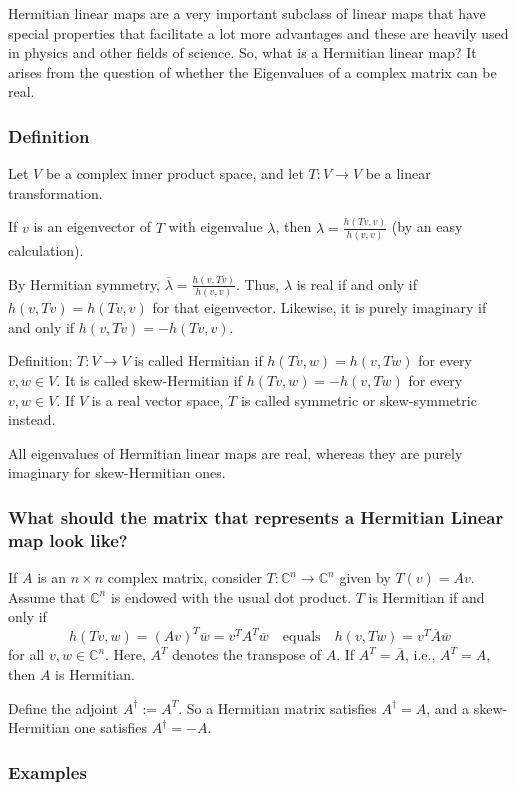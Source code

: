 Hermitian linear maps are a very important subclass of linear maps that have special properties that facilitate a lot more advantages and these are heavily used in physics and other fields of science. So, what is a Hermitian linear map? It arises from the question of whether the Eigenvalues of a complex matrix can be real. 

\subsubsection{Definition}

Let $V$ be a complex inner product space, and let $T: V \to V$ be a linear transformation.

If $v$ is an eigenvector of $T$ with eigenvalue $\lambda$, then $\lambda = \frac{h(Tv, v)}{h(v, v)}$ (by an easy calculation).

By Hermitian symmetry, $ \overline{\lambda} = \frac{h(v, Tv)}{h(v, v)}$. Thus, $\lambda$ is real if and only if $h(v, Tv) = h(Tv, v)$ for that eigenvector. Likewise, it is purely imaginary if and only if $h(v, Tv) = -h(Tv, v)$.

Definition: $T: V \to V$ is called Hermitian if $h(Tv, w) = h(v, Tw)$ for every $v, w \in V$. It is called skew-Hermitian if $h(Tv, w) = -h(v, Tw)$ for every $v, w \in V$. If $V$ is a real vector space, $T$ is called symmetric or skew-symmetric instead.

All eigenvalues of Hermitian linear maps are real, whereas they are purely imaginary for skew-Hermitian ones.

\subsubsection{What should the matrix that represents a Hermitian Linear map look like?}

If $A$ is an $n \times n$ complex matrix, consider $T: \mathbb{C}^n \to \mathbb{C}^n$ given by $T(v) = Av$. Assume that $\mathbb{C}^n$ is endowed with the usual dot product. $T$ is Hermitian if and only if
\[
h(Tv, w) = (Av)^T \overline{w} = v^T A^T \overline{w} \quad \text{equals} \quad h(v, Tw) = v^T \overline{A} \overline{w}
\]
for all $v, w \in \mathbb{C}^n$. Here, $A^T$ denotes the transpose of $A$. If $A^T = \overline{A}$, i.e., $A^T = A$, then $A$ is Hermitian.

Define the adjoint $A^\dagger:= A^T$. So a Hermitian matrix satisfies $A^\dagger = A$, and a skew-Hermitian one satisfies $A^\dagger = -A$.


\subsubsection{Examples}

